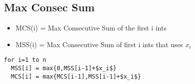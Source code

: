 \documentclass[12pt]{article}
\providecommand{\tightlist}{
    \setlength{\itemsep}{0pt}\setlength{\parskip}{0pt}
}
\begin{document}
\subsection{Max Consec Sum}
\begin{itemize}\tightlist
  \item MCS(i) = Max Consecutive Sum of the first i ints
  \item MSS(i) = Max Consecutive Sum of first i ints that uses $x_i$
\end{itemize}
\begin{lstlisting}
for i=1 to n
  MSS[i] = max{0,MSS[i-1]+$x_i$}
  MCS[i] = max{MCS[i-1],MSS[i-1]+$x_i$}
\end{lstlisting}
\end{document}
